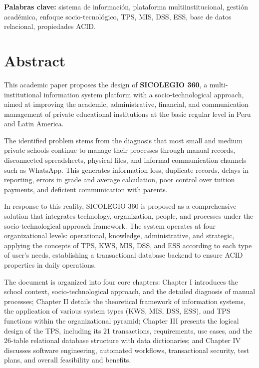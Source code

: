 \documentclass[12pt,a4paper,oneside]{report}
\begin{document}
\textbf{Palabras clave:} sistema de información, plataforma multiinstitucional, gestión académica, enfoque socio-tecnológico, TPS, MIS, DSS, ESS, base de datos relacional, propiedades ACID.

\chapter*{Abstract}

This academic paper proposes the design of \textbf{SICOLEGIO 360}, a multi-institutional information system platform with a socio-technological approach, aimed at improving the academic, administrative, financial, and communication management of private educational institutions at the basic regular level in Peru and Latin America.

The identified problem stems from the diagnosis that most small and medium private schools continue to manage their processes through manual records, disconnected spreadsheets, physical files, and informal communication channels such as WhatsApp. This generates information loss, duplicate records, delays in reporting, errors in grade and average calculation, poor control over tuition payments, and deficient communication with parents.

In response to this reality, SICOLEGIO 360 is proposed as a comprehensive solution that integrates technology, organization, people, and processes under the socio-technological approach framework. The system operates at four organizational levels: operational, knowledge, administrative, and strategic, applying the concepts of TPS, KWS, MIS, DSS, and ESS according to each type of user's needs, establishing a transactional database backend to ensure ACID properties in daily operations.

The document is organized into four core chapters: Chapter I introduces the school context, socio-technological approach, and the detailed diagnosis of manual processes; Chapter II details the theoretical framework of information systems, the application of various system types (KWS, MIS, DSS, ESS), and TPS functions within the organizational pyramid; Chapter III presents the logical design of the TPS, including its 21 transactions, requirements, use cases, and the 26-table relational database structure with data dictionaries; and Chapter IV discusses software engineering, automated workflows, transactional security, test plans, and overall feasibility and benefits.
\end{document}
